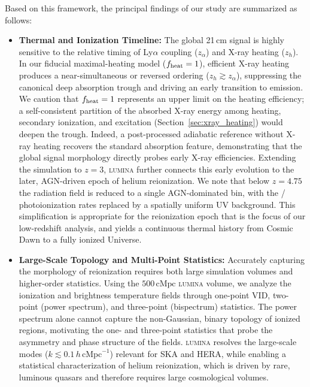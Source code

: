 \documentclass[apj,twocolumn, appendixfloats, twocolappendix, numberedappendix, tighten]{openjournal}
\DeclareRobustCommand{\lumina}{\mbox{\textsc{lumina}}\xspace}
\begin{document}
Based on this framework, the principal findings of our study are summarized as follows:
\begin{itemize}
\item \textbf{Thermal and Ionization Timeline:} The global 21\,cm signal is highly sensitive to the relative timing of Ly$\alpha$ coupling ($z_\alpha$) and X-ray heating ($z_h$). In our fiducial maximal-heating model ($f_{\rm heat}=1$), efficient X-ray heating produces a near-simultaneous or reversed ordering ($z_h \gtrsim z_\alpha$), suppressing the canonical deep absorption trough and driving an early transition to emission. We caution that $f_{\rm heat}=1$ represents an upper limit on the heating efficiency; a self-consistent partition of the absorbed X-ray energy among heating, secondary ionization, and excitation (Section~\ref{sec:xray_heating}) would deepen the trough. Indeed, a post-processed adiabatic reference without X-ray heating recovers the standard absorption feature, demonstrating that the global signal morphology directly probes early X-ray efficiencies. Extending the simulation to $z=3$, \lumina further connects this early evolution to the later, AGN-driven epoch of helium reionization. We note that below $z=4.75$ the radiation field is reduced to a single AGN-dominated bin, with the / photoionization rates replaced by a spatially uniform UV background. This simplification is appropriate for the  reionization epoch that is the focus of our low-redshift analysis, and yields a continuous thermal history from Cosmic Dawn to a fully ionized Universe.

\item \textbf{Large-Scale Topology and Multi-Point Statistics:} Accurately capturing the morphology of reionization requires both large simulation volumes and higher-order statistics. Using the $500\,\mathrm{cMpc}$ \lumina volume, we analyze the ionization and brightness temperature fields through one-point VID, two-point (power spectrum), and three-point (bispectrum) statistics. The power spectrum alone cannot capture the non-Gaussian, binary topology of ionized regions, motivating the one- and three-point statistics that probe the asymmetry and phase structure of the fields. \lumina resolves the large-scale modes ($k \lesssim 0.1\,h\,\mathrm{cMpc}^{-1}$) relevant for SKA and HERA, while enabling a statistical characterization of helium reionization, which is driven by rare, luminous quasars and therefore requires large cosmological volumes.


\end{itemize}
\end{document}
